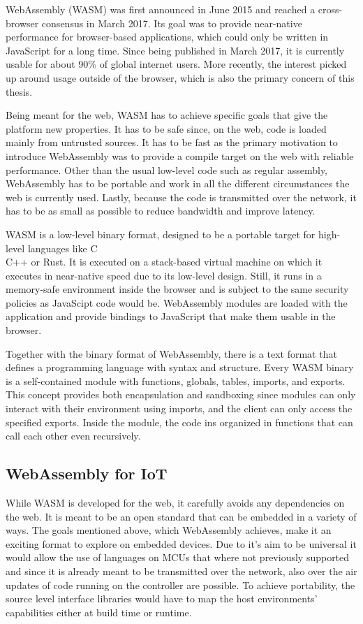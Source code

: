 WebAssembly (WASM) was first announced in June 2015 and reached a cross-browser consensus in March 2017. Its goal was to provide near-native performance for browser-based applications, which could only be written in JavaScript for a long time. Since being published in March 2017, it is currently usable for about 90\% of global internet users. More recently, the interest picked up around usage outside of the browser, which is also the primary concern of this thesis.

Being meant for the web, WASM has to achieve specific goals that give the platform new properties. It has to be safe since, on the web, code is loaded mainly from untrusted sources. It has to be fast as the primary motivation to introduce WebAssembly was to provide a compile target on the web with reliable performance. Other than the usual low-level code such as regular assembly, WebAssembly has to be portable and work in all the different circumstances the web is currently used. Lastly, because the code is transmitted over the network, it has to be as small as possible to reduce bandwidth and improve latency.

WASM is a low-level binary format, designed to be a portable target for high-level languages like C\\C++ or Rust. It is executed on a stack-based virtual machine on which it executes in near-native speed due to its low-level design. Still, it runs in a memory-safe environment inside the browser and is subject to the same security policies as JavaScipt code would be. WebAssembly modules are loaded with the application and provide bindings to JavaScript that make them usable in the browser.

Together with the binary format of WebAssembly, there is a text format that defines a programming language with syntax and structure. Every WASM binary is a self-contained module with functions, globals, tables, imports, and exports. This concept provides both encapsulation and sandboxing since modules can only interact with their environment using imports, and the client can only access the specified exports. Inside the module, the code ins organized in functions that can call each other even recursively.
\subsection{WebAssembly for IoT}
While WASM is developed for the web, it carefully avoids any dependencies on the web. It is meant to be an open standard that can be embedded in a variety of ways. The goals mentioned above, which WebAssembly achieves, make it an exciting format to explore on embedded devices. Due to it's aim to be universal it would allow the use of languages on MCUs that where not previously supported and since it is already meant to be transmitted over the network, also over the air updates of code running on the controller are possible. To achieve portability, the source level interface libraries would have to map the host environments' capabilities either at build time or runtime.

